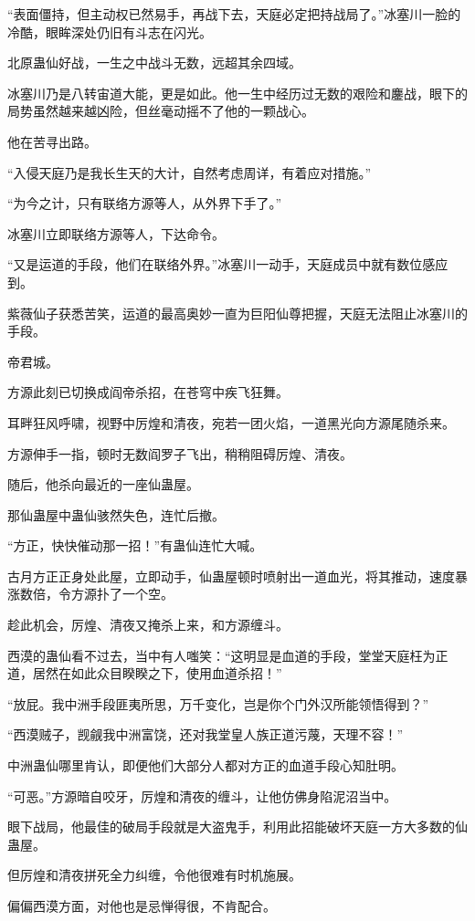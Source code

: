 \begin{this_body}
“表面僵持，但主动权已然易手，再战下去，天庭必定把持战局了。”冰塞川一脸的冷酷，眼眸深处仍旧有斗志在闪光。

北原蛊仙好战，一生之中战斗无数，远超其余四域。

冰塞川乃是八转宙道大能，更是如此。他一生中经历过无数的艰险和鏖战，眼下的局势虽然越来越凶险，但丝毫动摇不了他的一颗战心。

他在苦寻出路。

“入侵天庭乃是我长生天的大计，自然考虑周详，有着应对措施。”

“为今之计，只有联络方源等人，从外界下手了。”

冰塞川立即联络方源等人，下达命令。

“又是运道的手段，他们在联络外界。”冰塞川一动手，天庭成员中就有数位感应到。

紫薇仙子获悉苦笑，运道的最高奥妙一直为巨阳仙尊把握，天庭无法阻止冰塞川的手段。

帝君城。

方源此刻已切换成阎帝杀招，在苍穹中疾飞狂舞。

耳畔狂风呼啸，视野中厉煌和清夜，宛若一团火焰，一道黑光向方源尾随杀来。

方源伸手一指，顿时无数阎罗子飞出，稍稍阻碍厉煌、清夜。

随后，他杀向最近的一座仙蛊屋。

那仙蛊屋中蛊仙骇然失色，连忙后撤。

“方正，快快催动那一招！”有蛊仙连忙大喊。

古月方正正身处此屋，立即动手，仙蛊屋顿时喷射出一道血光，将其推动，速度暴涨数倍，令方源扑了一个空。

趁此机会，厉煌、清夜又掩杀上来，和方源缠斗。

西漠的蛊仙看不过去，当中有人嗤笑：“这明显是血道的手段，堂堂天庭枉为正道，居然在如此众目睽睽之下，使用血道杀招！”

“放屁。我中洲手段匪夷所思，万千变化，岂是你个门外汉所能领悟得到？”

“西漠贼子，觊觎我中洲富饶，还对我堂皇人族正道污蔑，天理不容！”

中洲蛊仙哪里肯认，即便他们大部分人都对方正的血道手段心知肚明。

“可恶。”方源暗自咬牙，厉煌和清夜的缠斗，让他仿佛身陷泥沼当中。

眼下战局，他最佳的破局手段就是大盗鬼手，利用此招能破坏天庭一方大多数的仙蛊屋。

但厉煌和清夜拼死全力纠缠，令他很难有时机施展。

偏偏西漠方面，对他也是忌惮得很，不肯配合。


\end{this_body}
